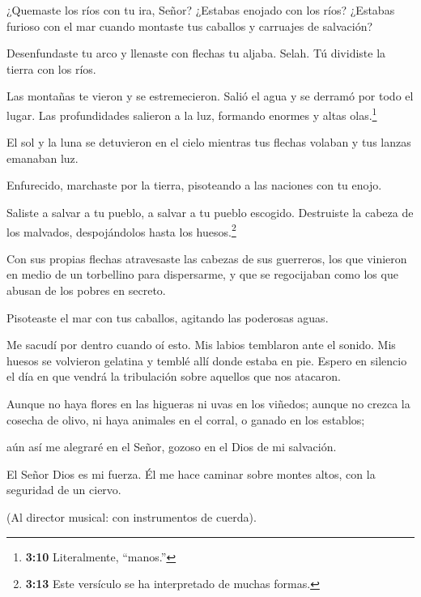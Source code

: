  ¿Quemaste los ríos con tu ira, Señor? ¿Estabas enojado con
los ríos? ¿Estabas furioso con el mar cuando montaste tus caballos y
carruajes de salvación?

 Desenfundaste tu arco y llenaste con flechas tu aljaba.
Selah. Tú dividiste la tierra con los ríos.

 Las montañas te vieron y se estremecieron. Salió el agua y
se derramó por todo el lugar. Las profundidades salieron a la luz,
formando enormes y altas olas.\footnote{\textbf{3:10} Literalmente,
  ``manos.''}

 El sol y la luna se detuvieron en el cielo mientras tus
flechas volaban y tus lanzas emanaban luz.

 Enfurecido, marchaste por la tierra, pisoteando a las
naciones con tu enojo.

 Saliste a salvar a tu pueblo, a salvar a tu pueblo
escogido. Destruiste la cabeza de los malvados, despojándolos hasta los
huesos.\footnote{\textbf{3:13} Este versículo se ha interpretado de
  muchas formas.}

 Con sus propias flechas atravesaste las cabezas de sus
guerreros, los que vinieron en medio de un torbellino para dispersarme,
y que se regocijaban como los que abusan de los pobres en secreto.

 Pisoteaste el mar con tus caballos, agitando las poderosas
aguas.

 Me sacudí por dentro cuando oí esto. Mis labios temblaron
ante el sonido. Mis huesos se volvieron gelatina y temblé allí donde
estaba en pie. Espero en silencio el día en que vendrá la tribulación
sobre aquellos que nos atacaron.

 Aunque no haya flores en las higueras ni uvas en los
viñedos; aunque no crezca la cosecha de olivo, ni haya animales en el
corral, o ganado en los establos;

 aún así me alegraré en el Señor, gozoso en el Dios de mi
salvación.

 El Señor Dios es mi fuerza. Él me hace caminar sobre
montes altos, con la seguridad de un ciervo.

(Al director musical: con instrumentos de cuerda).
